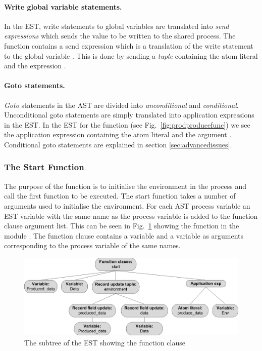 \paragraph*{Write global variable statements.}
In the EST, write statements to global variables are translated into \emph{send expressions} which sends the value to be written to the shared process. The function  contains a send expression which is a translation of the write statement to the global variable . This is done by sending a \emph{tuple} containing the atom literal  and the expression .

\paragraph*{Goto statements.}
\emph{Goto} statements in the AST are divided into \emph{unconditional} and \emph{conditional}. Unconditional goto statements are simply translated into application expressions in the EST. In the EST for the function  (see Fig.~\ref{fig:prodproducefunc}) we see the application expression containing the atom literal  and the argument . Conditional goto statements are explained in section \ref{sec:advancedissues}. 


\subsubsection{The Start Function}
The purpose of the  function is to initialise the environment in the process and call the first function to be executed. The start function takes a number of arguments used to initialise the environment. For each AST process variable an EST variable with the same name as the process variable is added to the function clause argument list. This can be seen in Fig.~\ref{fig:startfunction} showing the  function in the module . The function clause contains a variable  and a variable  as arguments corresponding to the process variable of the same names.  

\begin{figure}[h]
\centering
\includegraphics[width=\textwidth]{translation/ast_to_est/graphics/producerest05.eps}
\caption{The subtree of the EST showing the  function clause}
\label{fig:startfunction}
\end{figure}

